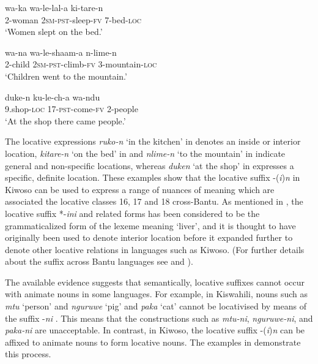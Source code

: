 \documentclass[output=paper]{langscibook}
\begin{document}
    \ex\label{ex:mallya:5b}
    \gll wa-ka        wa-le-lal-a        ki-tare-n\\
       2-woman  2\textsc{sm}-\textsc{pst}-sleep-\textsc{fv}    7-bed-\textsc{loc}\\
     \glt ‘Women slept on the bed.’

    \ex\label{ex:mallya:5c}
    \gll wa-na    wa-le-shaam-a        n-lime-n\\
     2-child  2\textsc{sm}-\textsc{pst}-climb-\textsc{fv}        3-mountain-\textsc{loc}\\
     \glt ‘Children went to the mountain.’

    \ex\label{ex:mallya:5d}
    \gll duke-n         ku-le-ch-a      wa-ndu\\
      9.shop-\textsc{loc}    17-\textsc{pst}-come-\textsc{fv}    2-people\\
   \glt ‘At the shop there came people.’
\z
\z

The locative expressions \textit{ruko-n} ‘in the kitchen’ in  denotes an inside or interior location, \textit{kitare-n} ‘on the bed’ in  and \textit{nlime-n} ‘to the mountain’ in  indicate general and non-specific locations, whereas \textit{duken} ‘at the shop’ in  expresses a specific, definite location. These examples show that the locative suffix -(\textit{i})\textit{n} in Kiwoso can be used to express a range of nuances of meaning which are associated the locative classes 16, 17 and 18 cross-Bantu. As mentioned in , the locative suffix *-\textit{ini} and related forms has been considered to be the grammaticalized form of the lexeme meaning ‘liver’, and it is thought to have originally been used to denote interior location before it expanded further to denote other locative relations in languages such as Kiwoso. (For further details about the suffix across Bantu languages see \citet[185--204]{Grégoire1975} and \citet[51--52]{Güldemann1999}).

The available evidence suggests that semantically, locative suffixes cannot occur with animate nouns in some languages. For example, in Kiswahili, nouns such as \textit{mtu} ‘person’ and \textit{nguruwe} ‘pig’ and \textit{paka} ‘cat’ cannot be locativised by means of the suffix -\textit{ni} \citep{Rugemalira2004}. This means that the constructions such as \textit{mtu-ni}, \textit{nguruwe-ni}, and \textit{paka-ni} are unacceptable. In contrast, in Kiwoso, the locative suffix -(\textit{i})\textit{n} can be affixed to animate nouns to form locative nouns. The examples in  demonstrate this process.
\end{document}
